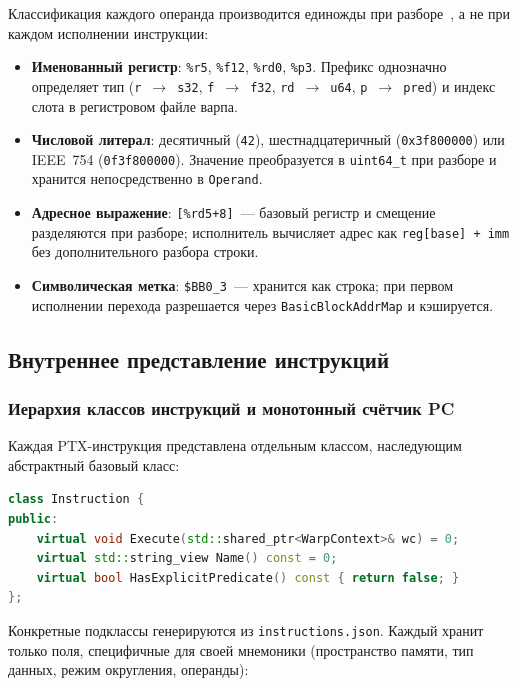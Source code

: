 Классификация каждого операнда производится единожды при разборе~\cite{Martynenko2004},
а не при каждом исполнении инструкции:

\begin{itemize}
  \item \textbf{Именованный регистр}: \texttt{\%r5}, \texttt{\%f12},
        \texttt{\%rd0}, \texttt{\%p3}. Префикс однозначно определяет тип
        (\texttt{r}~$\to$~\texttt{s32}, \texttt{f}~$\to$~\texttt{f32},
        \texttt{rd}~$\to$~\texttt{u64}, \texttt{p}~$\to$~\texttt{pred})
        и индекс слота в регистровом файле варпа.
  \item \textbf{Числовой литерал}: десятичный (\texttt{42}),
        шестнадцатеричный (\texttt{0x3f800000}) или IEEE~754
        (\texttt{0f3f800000}). Значение преобразуется в \texttt{uint64\_t}
        при разборе и хранится непосредственно в \texttt{Operand}.
  \item \textbf{Адресное выражение}: \texttt{[\%rd5+8]}~--- базовый
        регистр и смещение разделяются при разборе; исполнитель
        вычисляет адрес как \texttt{reg[base] + imm} без дополнительного
        разбора строки.
  \item \textbf{Символическая метка}: \texttt{\$BB0\_3}~---
        хранится как строка; при первом исполнении перехода
        разрешается через \texttt{BasicBlockAddrMap} и кэшируется.
\end{itemize}

\subsection{Внутреннее представление инструкций}

\subsubsection{Иерархия классов инструкций и монотонный счётчик PC}

Каждая PTX-инструкция представлена отдельным классом, наследующим
абстрактный базовый класс:

\begin{lstlisting}[language=C++, caption={Базовый класс (build/app/ptx\_asm/autogen/instructions.h)}]
class Instruction {
public:
    virtual void Execute(std::shared_ptr<WarpContext>& wc) = 0;
    virtual std::string_view Name() const = 0;
    virtual bool HasExplicitPredicate() const { return false; }
};
\end{lstlisting}

Конкретные подклассы генерируются из \texttt{instructions.json}.
Каждый хранит только поля, специфичные для своей мнемоники
(пространство памяти, тип данных, режим округления, операнды):

